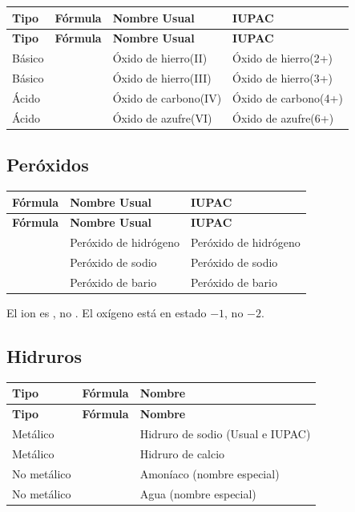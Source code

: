 \begin{longtable}{C{2.0cm} L{2.8cm} L{4.0cm} L{3.6cm}}
\toprule
\textbf{Tipo} & \textbf{Fórmula} & \textbf{Nombre Usual} & \textbf{IUPAC} \\
\midrule\endfirsthead\toprule
\textbf{Tipo} & \textbf{Fórmula} & \textbf{Nombre Usual} & \textbf{IUPAC} \\
\midrule\endhead\bottomrule\endlastfoot
Básico &         & Óxido de hierro(II)  & Óxido de hierro(2+) \\
Básico &  & Óxido de hierro(III) & Óxido de hierro(3+) \\
Ácido  &    & Óxido de carbono(IV) & Óxido de carbono(4+) \\
Ácido  &    & Óxido de azufre(VI)  & Óxido de azufre(6+) \\
\bottomrule
\end{longtable}

\subsection*{\textcolor{blueunam}{Peróxidos}}

\begin{longtable}{C{2.4cm} L{3.6cm} L{3.6cm}}
\toprule
\textbf{Fórmula} & \textbf{Nombre Usual} & \textbf{IUPAC} \\
\midrule\endfirsthead\toprule
\textbf{Fórmula} & \textbf{Nombre Usual} & \textbf{IUPAC} \\
\midrule\endhead\bottomrule\endlastfoot
{}  & Peróxido de hidrógeno & Peróxido de hidrógeno \\
 & Peróxido de sodio     & Peróxido de sodio \\
  & Peróxido de bario     & Peróxido de bario \\
\bottomrule
\end{longtable}

El ion es , no . El oxígeno está en estado $-1$, no $-2$.

\subsection*{\textcolor{blueunam}{Hidruros}}

\begin{longtable}{C{2.0cm} L{2.8cm} L{5.4cm}}
\toprule
\textbf{Tipo} & \textbf{Fórmula} & \textbf{Nombre} \\
\midrule\endfirsthead\toprule
\textbf{Tipo} & \textbf{Fórmula} & \textbf{Nombre} \\
\midrule\endhead\bottomrule\endlastfoot
Metálico    &        & Hidruro de sodio (Usual e IUPAC) \\
Metálico    &  & Hidruro de calcio \\
No metálico &   & Amoníaco (nombre especial) \\
No metálico &   & Agua (nombre especial) \\
\bottomrule
\end{longtable}

